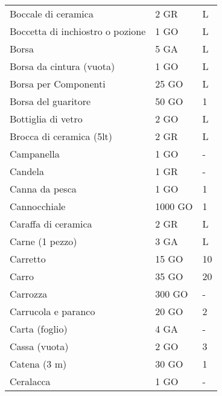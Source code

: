 \documentclass[12pt,a4paper,twoside,openany]{book}
\begin{document}
\begin{multicols}{2}
{\begin{tabularx}{0.42\textwidth}{lll}
Boccale di ceramica & 2 GR& L\\
Boccetta di inchiostro o pozione  & 1 GO& L \\
Borsa&5 GA&L\\
Borsa da cintura (vuota) & 1 GO& L\\
Borsa per Componenti &25 GO&L\\
Borsa del guaritore& 50 GO  & 1\\
Bottiglia di vetro  & 2 GO& L \\
Brocca di ceramica  (5lt) & 2 GR& L\\
Campanella  & 1 GO& - \\
Candela & 1 GR& -\\
Canna da pesca & 1 GO&1\\
Cannocchiale  & 1000 GO  & 1 \\
Caraffa di ceramica & 2 GR& L\\
Carne (1 pezzo) & 3 GA& L\\
Carretto  & 15 GO  & 10\\
Carro & 35 GO& 20\\
Carrozza  & 300 GO & -\\
Carrucola e paranco & 20 GO& 2 \\
Carta (foglio)& 4 GA& -\\
Cassa (vuota) & 2 GO& 3 \\
Catena (3 m)  & 30 GO & 1\\
Ceralacca& 1 GO& -\\
\end{tabularx}

}
\end{multicols}
\end{document}
